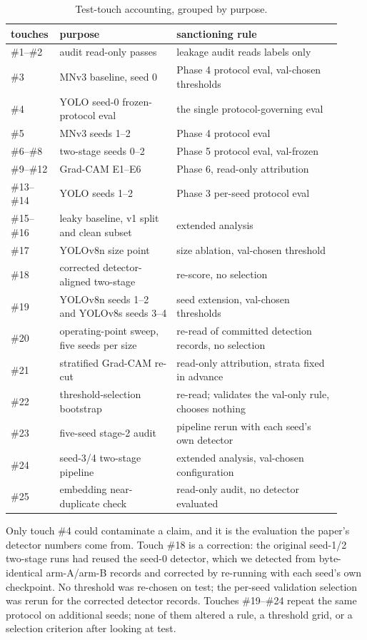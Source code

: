 \begin{table}[t]
\centering
\small
\caption{Test-touch accounting, grouped by purpose.}
\label{tab:touches}
\begin{tabular}{@{}p{0.10\linewidth}p{0.34\linewidth}p{0.48\linewidth}@{}}
\toprule
touches & purpose & sanctioning rule \\
\midrule
\#1--\#2 & audit read-only passes & leakage audit reads labels only \\
\#3 & MNv3 baseline, seed 0 & Phase 4 protocol eval, val-chosen thresholds \\
\#4 & YOLO seed-0 frozen-protocol eval & the single protocol-governing eval \\
\#5 & MNv3 seeds 1--2 & Phase 4 protocol eval \\
\#6--\#8 & two-stage seeds 0--2 & Phase 5 protocol eval, val-frozen \\
\#9--\#12 & Grad-CAM E1--E6 & Phase 6, read-only attribution \\
\#13--\#14 & YOLO seeds 1--2 & Phase 3 per-seed protocol eval \\
\#15--\#16 & leaky baseline, v1 split and clean subset & extended analysis \\
\#17 & YOLOv8n size point & size ablation, val-chosen threshold \\
\#18 & corrected detector-aligned two-stage & re-score, no selection \\
\#19 & YOLOv8n seeds 1--2 and YOLOv8s seeds 3--4 & seed extension, val-chosen thresholds \\
\#20 & operating-point sweep, five seeds per size & re-read of committed detection records, no selection \\
\#21 & stratified Grad-CAM re-cut & read-only attribution, strata fixed in advance \\
\#22 & threshold-selection bootstrap & re-read; validates the val-only rule, chooses nothing \\
\#23 & five-seed stage-2 audit & pipeline rerun with each seed's own detector \\
\#24 & seed-3/4 two-stage pipeline & extended analysis, val-chosen configuration \\
\#25 & embedding near-duplicate check & read-only audit, no detector evaluated \\
\bottomrule
\end{tabular}
\end{table}

Only touch \#4 could contaminate a claim, and it is the evaluation the paper's
detector numbers come from. Touch \#18 is a correction: the original seed-1/2
two-stage runs had reused the seed-0 detector, which we detected from
byte-identical arm-A/arm-B records and corrected by re-running with each seed's
own checkpoint. No threshold was re-chosen on test; the per-seed validation
selection was rerun for the corrected detector records. Touches \#19--\#24 repeat
the same protocol on additional seeds; none of them altered a rule, a threshold
grid, or a selection criterion after looking at test.


